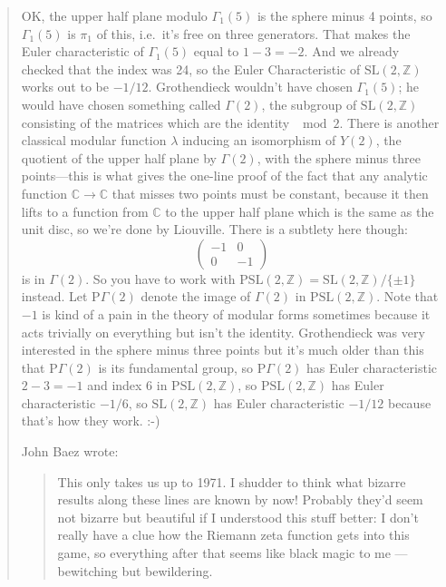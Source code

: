 \documentclass{article}
\begin{document}
\begin{quote}
OK, the upper half plane modulo \(\Gamma_1(5)\) is the sphere minus 4
points, so \(\Gamma_1(5)\) is \(\pi_1\) of this, i.e.~it's free on three
generators. That makes the Euler characteristic of \(\Gamma_1(5)\) equal
to \(1-3=-2\). And we already checked that the index was 24, so the
Euler Characteristic of \(\mathrm{SL}(2,\mathbb{Z})\) works out to be
\(-1/12\). Grothendieck wouldn't have chosen \(\Gamma_1(5)\); he would
have chosen something called \(\Gamma(2)\), the subgroup of
\(\mathrm{SL}(2,\mathbb{Z})\) consisting of the matrices which are the
identity \(\mod 2\). There is another classical modular function
\(\lambda\) inducing an isomorphism of \(Y(2)\), the quotient of the
upper half plane by \(\Gamma(2)\), with the sphere minus three
points---this is what gives the one-line proof of the fact that any
analytic function \(\mathbb{C}\to\mathbb{C}\) that misses two points
must be constant, because it then lifts to a function from
\(\mathbb{C}\) to the upper half plane which is the same as the unit
disc, so we're done by Liouville. There is a subtlety here though: \[
  \left(\begin{array}{rr}-1&0\\0&-1\end{array}\right)
\] is in \(\Gamma(2)\). So you have to work with
\(\mathrm{PSL}(2,\mathbb{Z})=\mathrm{SL}(2,\mathbb{Z})/\{\pm1\}\)
instead. Let \(\mathrm{P}\Gamma(2)\) denote the image of \(\Gamma(2)\)
in \(\mathrm{PSL}(2,\mathbb{Z})\). Note that \(-1\) is kind of a pain in
the theory of modular forms sometimes because it acts trivially on
everything but isn't the identity. Grothendieck was very interested in
the sphere minus three points but it's much older than this that
\(\mathrm{P}\Gamma(2)\) is its fundamental group, so
\(\mathrm{P}\Gamma(2)\) has Euler characteristic \(2-3=-1\) and index 6
in \(\mathrm{PSL}(2,\mathbb{Z})\), so \(\mathrm{PSL}(2,\mathbb{Z})\) has
Euler characteristic \(-1/6\), so \(\mathrm{SL}(2,\mathbb{Z})\) has
Euler characteristic \(-1/12\) because that's how they work. :-)

John Baez wrote:

\begin{quote}
This only takes us up to 1971. I shudder to think what bizarre results
along these lines are known by now! Probably they'd seem not bizarre but
beautiful if I understood this stuff better: I don't really have a clue
how the Riemann zeta function gets into this game, so everything after
that seems like black magic to me --- bewitching but bewildering.
\end{quote}


\end{quote}
\end{document}

